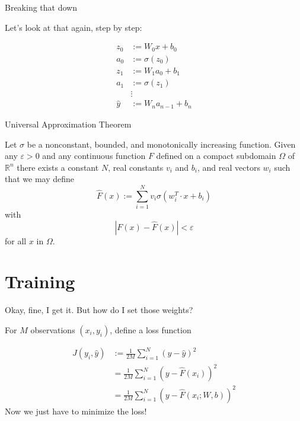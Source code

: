 \documentclass[11pt]{beamer}
\let\epsilon=\varepsilon
\newcommand{\R}{\mathbb{R}}
\begin{document}
\begin{frame}{Breaking that down}

Let's look at that again, step by step:

\begin{align*}
z_0 &:= W_0x + b_0 \\
a_0 &:= \sigma(z_0) \\
z_1 &:= W_1a_0 + b_1 \\
a_1 &:= \sigma(z_1) \\
&\vdots \\
\widehat{y} &:= W_n a_{n-1} + b_n
\end{align*}

\end{frame}

\begin{frame}{Universal Approximation Theorem}
\begin{theorem}
Let $\sigma$ be a nonconstant, bounded, and monotonically increasing function.
Given any $\epsilon > 0$ and any continuous function $F$ defined on a compact subdomain $\Omega$ of $\R^n$ there exists a constant $N$, real constants $v_i$ and $b_i$, and real vectors $w_i$ such that we may define
$$\widehat{F}(x) := \sum_{i = 1}^N v_i \sigma(w_i^T \cdot x + b_i)$$
with
$$\left|F(x) - \widehat{F}(x)\right| < \epsilon$$
for all $x$ in $\Omega$.
\end{theorem}
\end{frame}

\section{Training}
\begin{frame}{Okay, fine, I get it. But how do I set those weights?}

For $M$ observations $(x_i, y_i)$, define a loss function

\begin{align*}
J(y_i, \widehat{y}) &:= \frac{1}{2M}\sum_{i =1}^N (y - \widehat{y})^2 \\
&= \frac{1}{2M}\sum_{i =1}^N \left(y - \widehat{F}(x_i)\right)^2 \\
&= \frac{1}{2M}\sum_{i =1}^N \left(y - \widehat{F}(x_i; W, b)\right)^2 
\end{align*}
Now we just have to minimize the loss!
\end{frame}
\end{document}
